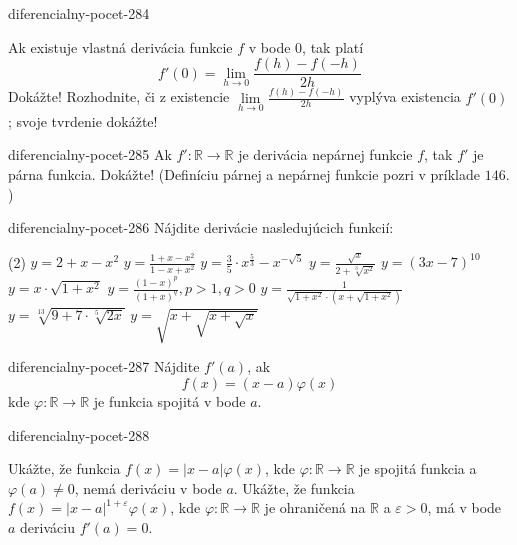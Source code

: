 \begin{defproblem}{diferencialny-pocet-284}
\begin{tasks}
\task
  Ak existuje vlastná derivácia funkcie $f$ v bode $0$, tak platí
  \[
    f'(0)=\lim_{h \rightarrow 0}\frac{f(h)-f(-h)}{2h}
  \]
  Dokážte!
\task
  Rozhodnite, či z existencie $\lim\limits_{h \rightarrow
  0}\frac{f(h)-f(-h)}{2h}$ vyplýva existencia $f'(0)$; svoje tvrdenie dokážte!
\end{tasks}
\end{defproblem}

\begin{defproblem}{diferencialny-pocet-285}
Ak $f':\mathbb{R}\rightarrow\mathbb{R}$ je derivácia nepárnej funkcie $f$, tak
$f'$ je párna funkcia. Dokážte! (Definíciu párnej a nepárnej funkcie pozri v
príklade $146.$)
\end{defproblem}

\begin{defproblem}{diferencialny-pocet-286}
Nájdite derivácie nasledujúcich funkcií:
\begin{tasks}(2)
  \task $y=2+x-x^2$
  \task $y=\frac{1+x-x^2}{1-x+x^2}$
  \task $y=\frac{3}{5}\cdot x^{\frac{5}{3}}-x^{-\sqrt{5}}$
  \task $y=\frac{\sqrt{x}}{2+\sqrt[3]{x^2}}$
  \task $y=(3x-7)^{10}$
  \task $y=x\cdot \sqrt{1+x^2}$
  \task $y=\frac{(1-x)^p}{(1+x)^q},p>1,q>0$
  \task $y=\frac{1}{\sqrt{1+x^2}\cdot (x+\sqrt{1+x^2})}$
  \task $y=\sqrt[13]{9+7\cdot \sqrt[5]{2x}}$
  \task $y=\sqrt{x+\sqrt{x+\sqrt{x}}}$
\end{tasks}
\end{defproblem}

\begin{defproblem}{diferencialny-pocet-287}
Nájdite $f'(a)$, ak
\[
  f(x)=(x-a)\varphi(x)
\]
kde $\varphi:\mathbb{R}\rightarrow\mathbb{R}$ je funkcia spojitá v bode $a$.
\end{defproblem}

\begin{defproblem}{diferencialny-pocet-288}
\begin{tasks}
\task
  Ukážte, že funkcia $f(x)=|x-a|\varphi(x)$, kde
  $\varphi:\mathbb{R}\rightarrow\mathbb{R}$ je spojitá funkcia a $\varphi(a)
  \neq 0$, nemá deriváciu v bode $a$.
\task
  Ukážte, že funkcia $f(x)=|x-a|^{1+\varepsilon}\varphi(x)$, kde
  $\varphi:\mathbb{R}\rightarrow\mathbb{R}$  je ohraničená na $\mathbb{R}$ a
  $\varepsilon>0$, má v bode $a$ deriváciu $f'(a)=0$.
\end{tasks}
\end{defproblem}

